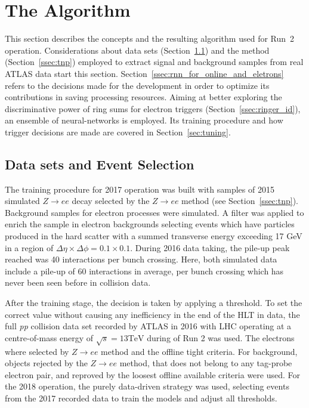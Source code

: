 \chapter{The \rnn{} Algorithm}%
\label{sec:neuralringer}

This section describes the \rnn{} concepts and the resulting algorithm used for Run~2
operation. Considerations about data sets (Section~\ref{ssec:dataset}) and the \TnP method
(Section~\ref{ssec:tnp}) employed to extract signal and background samples
from real ATLAS data start this section. Section~\ref{ssec:rnn_for_online_and_eletrons} refers to the
decisions made for the \rnn{} development in order to optimize its contributions in saving processing resources. Aiming at better exploring the discriminative
power of ring sums for electron triggers (Section~\ref{ssec:ringer_id}),
an ensemble of neural-networks is employed. Its training procedure and how trigger decisions are made are covered in Section~\ref{sec:tuning}.




\section{Data sets and Event Selection}%
\label{ssec:dataset}

The training procedure for 2017 operation was built with samples of 2015 simulated $Z\rightarrow ee$ decay selected by the $Z\rightarrow ee$ \TnP method (see Section~\ref{ssec:tnp}). Background samples for electron processes were simulated. A filter was applied to enrich the sample in electron backgrounds selecting events which have particles produced in the hard scatter with a summed transverse energy exceeding 17 GeV in a region of $\Delta\eta\times\Delta\phi=0.1\times0.1$. During 2016 data taking, the pile-up peak reached was 40 interactions per bunch crossing.
Here, both simulated data include a pile-up of 60 interactions in average, per bunch crossing which has never been seen before in collision data.

After the training stage, the decision is taken by applying a threshold. To set the correct value without causing any inefficiency in the end of the HLT in data, the full \textit{pp} collision data set recorded by ATLAS in 2016 with LHC operating at a centre-of-mass energy of $\sqrt{s}=13 \text{TeV}$ during of Run 2 was used. The electrons where selected by $Z\rightarrow ee$ \TnP method and the offline tight criteria. For background, objects rejected by the $Z\rightarrow ee$ \TnP method, that does not belong to any tag-probe electron pair, and reproved by the loosest offline available criteria were used. For the 2018 operation, the purely data-driven strategy was used, selecting events from the 2017 recorded data to train the models and adjust all thresholds.

